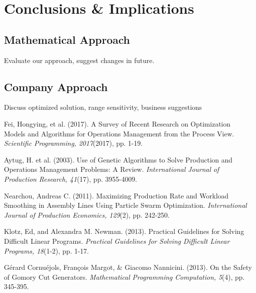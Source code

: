 \documentclass{article}
\begin{document}
\section{Conclusions \& Implications}
\subsection{Mathematical Approach}
Evaluate our approach, suggest changes in future.
\subsection{Company Approach}
Discuss optimized solution, range sensitivity, business suggestions
	\newpage
	\begin{thebibliography}{5}
	
Fei, Hongying, et al. (2017). A Survey of Recent Research on Optimization Models and Algorithms for Operations Management from the Process View. 
\textit{Scientific Programming, 2017}(2017), pp. 1-19.
	
Aytug, H. et al. (2003). Use of Genetic Algorithms to Solve Production and Operations Management Problems: A Review. 
\textit{International Journal of Production Research, 41}(17), pp. 3955-4009.

Nearchou, Andreas C. (2011). Maximizing Production Rate and Workload Smoothing in Assembly Lines Using Particle Swarm Optimization. 
\textit{International Journal of Production Economics, 129}(2), pp. 242-250.

Klotz, Ed, and Alexandra M. Newman. (2013). Practical Guidelines for Solving Difficult Linear Programs. 
\textit{Practical Guidelines for Solving Difficult Linear Programs, 18}(1-2), pp. 1-17.

G\'{e}rard Cornu\'{e}jols, Fran\c{c}ois Margot, \& Giacomo Nannicini. (2013). On the Safety of Gomory Cut Generators. 
\textit{Mathematical Programming Computation, 5}(4), pp. 345-395.


\end{thebibliography}
\end{document}
